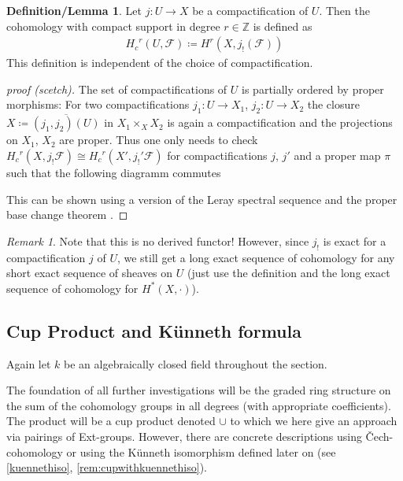 \documentclass[english,headsepline=0.25pt]{scrartcl}
\theoremstyle{definition}
\newtheorem{DefLem}[Def]{Definition/Lemma}
\theoremstyle{remark}
\newtheorem{Rem}[Def]{Remark}
\newcommand*{\Z}{\mathds{Z}}
\newcommand*{\F}{\mathcal{F}} %
\newcommand*{\Hc}{{H_c}} %
\begin{document}
\begin{DefLem}\label{def:cptcohomology}
  Let $j\colon U\to X$ be a compactification of $U$. Then the
  cohomology with compact support in degree $r\in\Z$ is defined as
  \begin{gather*}
    \Hc^r(U,\F) \coloneqq H^r(X,j_!(\F))
  \end{gather*}
  This definition is independent of the choice of compactification.
  \begin{proof}[proof (scetch)]
    The set of compactifications of $U$ is partially ordered by proper
    morphisms:
    For two compactifications $j_1\colon U\to X_1$,
    $j_2\colon U\to X_2$ the closure
    $X\coloneqq\overline{(j_1,j_2)(U)}$ in $X_1\times_X X_2$ is again
    a compactification and the projections on $X_1$, $X_2$ are proper.
    Thus one only needs to check $\Hc^r(X,j_!\F)\cong\Hc^r(X',j_!'\F)$
    for compactifications $j$, $j'$ and a proper map $\pi$ such that
    the following diagramm commutes
    \begin{center}
    \end{center}
    This can be shown using a version of the Leray spectral
    sequence and the proper base change theorem
    \cite[][Thm. I.18.2]{milne}.
  \end{proof}
\end{DefLem}

\begin{Rem}
  Note that this is no derived functor!
  However, since $j_!$ is exact for a compactification $j$ of $U$, we
  still get a long exact sequence of cohomology for any short exact
  sequence of sheaves on $U$
  (just use the definition and the long exact sequence of cohomology for
  $H^*(X,\cdot)$).
\end{Rem}

\subsection{Cup Product and Künneth formula}
Again let $k$ be an algebraically closed field throughout the
section.

The foundation of all further investigations will be the graded
ring structure on the sum of the cohomology groups in all degrees
(with appropriate coefficients). The product will be a cup product
denoted $\cup$ to which we here give an approach via pairings of
Ext-groups. 
However, there are concrete descriptions using Čech-cohomology
\cite[see][Chap.~I.10 and Chap.~I.22, Cup-products]{milne}
or using the Künneth isomorphism defined later on (see
\ref{kuennethiso}, \ref{rem:cupwithkuennethiso}).
\end{document}
